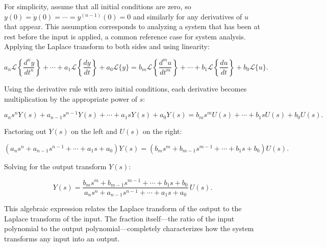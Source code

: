 For simplicity, assume that all initial conditions are zero, so $y(0) = \dot{y}(0) = \cdots = y^{(n-1)}(0) = 0$ and similarly for any derivatives of $u$ that appear. This assumption corresponds to analyzing a system that has been at rest before the input is applied, a common reference case for system analysis. Applying the Laplace transform to both sides and using linearity:

\[
a_n \mathcal{L}\left\{\frac{d^n y}{dt^n}\right\} + \cdots + a_1 \mathcal{L}\left\{\frac{dy}{dt}\right\} + a_0 \mathcal{L}\{y\} = b_m \mathcal{L}\left\{\frac{d^m u}{dt^m}\right\} + \cdots + b_1 \mathcal{L}\left\{\frac{du}{dt}\right\} + b_0 \mathcal{L}\{u\}.
\]

Using the derivative rule with zero initial conditions, each derivative becomes multiplication by the appropriate power of $s$:

\[
a_n s^n Y(s) + a_{n-1} s^{n-1} Y(s) + \cdots + a_1 s Y(s) + a_0 Y(s) = b_m s^m U(s) + \cdots + b_1 s U(s) + b_0 U(s).
\]

Factoring out $Y(s)$ on the left and $U(s)$ on the right:

\[
\left(a_n s^n + a_{n-1} s^{n-1} + \cdots + a_1 s + a_0\right) Y(s) = \left(b_m s^m + b_{m-1} s^{m-1} + \cdots + b_1 s + b_0\right) U(s).
\]

Solving for the output transform $Y(s)$:

\[
Y(s) = \frac{b_m s^m + b_{m-1} s^{m-1} + \cdots + b_1 s + b_0}{a_n s^n + a_{n-1} s^{n-1} + \cdots + a_1 s + a_0} \, U(s).
\]

This algebraic expression relates the Laplace transform of the output to the Laplace transform of the input. The fraction itself---the ratio of the input polynomial to the output polynomial---completely characterizes how the system transforms any input into an output.


